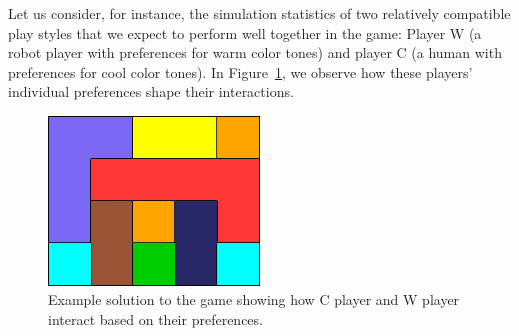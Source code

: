         \noindent
        Let us consider, for instance, the simulation statistics of two relatively compatible play styles that we expect to perform well together in the game: Player W (a robot player with preferences for warm color tones) and player C (a human with preferences for cool color tones). In Figure~\ref{fig:cw-solution}, we observe how these players' individual preferences shape their interactions.
        \begin{figure}[H]
            \centering
            \includegraphics[width=0.5\textwidth]{images/cw-solution.png}
            \caption{Example solution to the game showing how C player and W player interact based on their preferences.}
            \label{fig:cw-solution}
        \end{figure}
        
